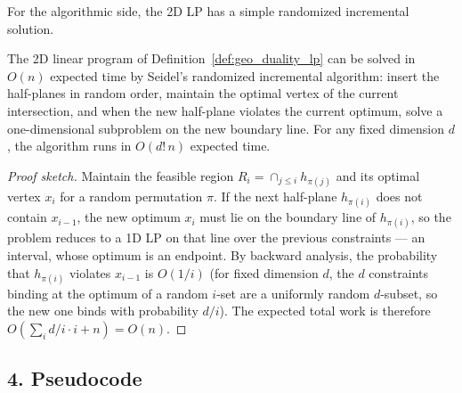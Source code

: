 For the algorithmic side, the 2D LP has a simple randomized incremental
solution.

\begin{theorem}\label{thm:geo_duality_seidel}
  The 2D linear program of Definition~\ref{def:geo_duality_lp} can be
  solved in $O(n)$ expected time by Seidel's randomized incremental
  algorithm: insert the half-planes in random order, maintain the optimal
  vertex of the current intersection, and when the new half-plane violates
  the current optimum, solve a one-dimensional subproblem on the new
  boundary line. For any fixed dimension $d$, the algorithm runs in
  $O(d! \, n)$ expected time.
\end{theorem}

\begin{proof}[Proof sketch]
  Maintain the feasible region $R_i = \cap_{j \le i} h_{\pi(j)}$ and its
  optimal vertex $x_i$ for a random permutation $\pi$. If the next
  half-plane $h_{\pi(i)}$ does not contain $x_{i-1}$, the new optimum $x_i$
  must lie on the boundary line of $h_{\pi(i)}$, so the problem reduces to a
  1D LP on that line over the previous constraints --- an interval, whose
  optimum is an endpoint. By backward analysis, the probability that
  $h_{\pi(i)}$ violates $x_{i-1}$ is $O(1/i)$ (for fixed dimension $d$, the
  $d$ constraints binding at the optimum of a random $i$-set are a uniformly
  random $d$-subset, so the new one binds with probability $d/i$). The
  expected total work is therefore $O(\sum_i d/i \cdot i + n) = O(n)$.
\end{proof}

\subsection{4. Pseudocode}

